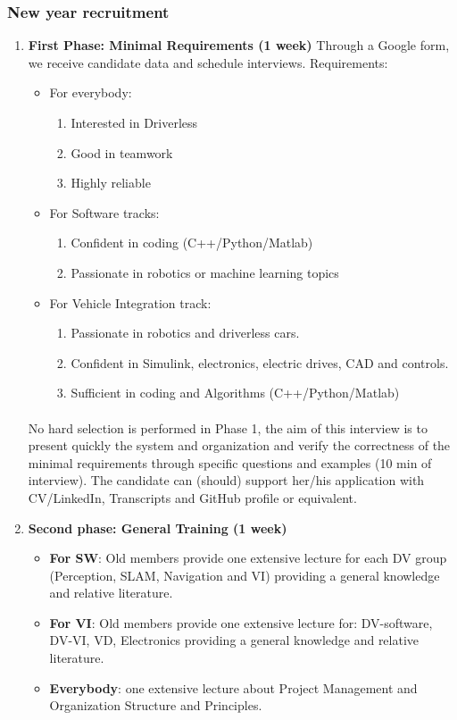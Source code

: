 \documentclass[graybox]{svmult}
\begin{document}
\subsubsection{New year recruitment}
\begin{enumerate}
  \item \textbf{First Phase: Minimal Requirements (1 week)}
  Through a Google form, we receive candidate data and schedule interviews.
  Requirements:
  \begin{itemize}
    \item For everybody:
    \begin{enumerate}
      \item Interested in Driverless
      \item Good in teamwork
      \item Highly reliable
    \end{enumerate}
    \item For Software tracks:
    \begin{enumerate}
      \item Confident in coding (C++/Python/Matlab)
      \item Passionate in robotics or machine learning topics
    \end{enumerate}
    \item For Vehicle Integration track:
    \begin{enumerate}
    	\item Passionate in robotics and driverless cars.
    	\item Confident in Simulink, electronics, electric drives, CAD and controls.
        \item Sufficient in coding and Algorithms (C++/Python/Matlab)
    \end{enumerate}
  \end{itemize}

\paragraph{}
No hard selection is performed in Phase 1, the aim of this interview is to present quickly the system and organization and verify the correctness of the minimal requirements through specific questions and examples (10 min of interview). The candidate can (should) support her/his application with CV/LinkedIn, Transcripts and GitHub profile or equivalent.

\item \textbf{Second phase: General Training (1 week)}
\begin{itemize}
\item \textbf{For SW}: Old members provide one extensive lecture for each DV group (Perception, SLAM, Navigation and VI) providing a general knowledge and relative literature.
\item \textbf{For VI}: Old members provide one extensive lecture for: DV-software, DV-VI, VD, Electronics providing a general knowledge and relative literature.
\item \textbf{Everybody}: one extensive lecture about Project Management and Organization Structure and Principles.
\end{itemize}


\end{enumerate}
\end{document}
